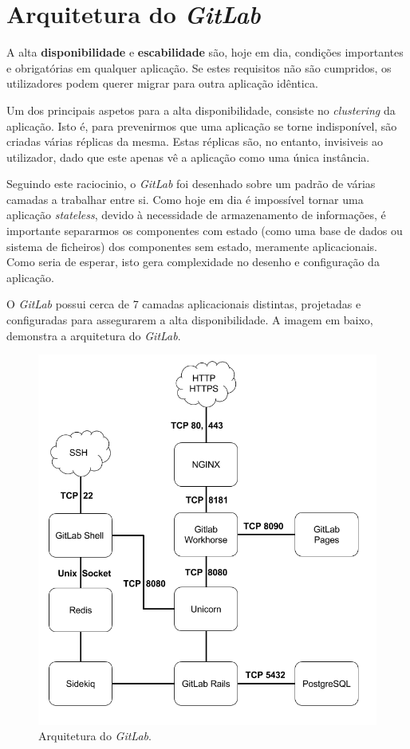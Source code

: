 \documentclass[12pt,a4paper]{article}
\begin{document}
\newpage
\section{Arquitetura do \emph{GitLab}}\label{arq}

A alta \textbf{disponibilidade} e \textbf{escabilidade} são, hoje em dia, condições importantes e obrigatórias em qualquer aplicação. Se estes requisitos não são cumpridos, os utilizadores podem querer migrar para outra aplicação idêntica.

Um dos principais aspetos para a alta disponibilidade, consiste no \emph{clustering} da aplicação. Isto é, para prevenirmos que uma aplicação se torne indisponível, são criadas várias réplicas da mesma. Estas réplicas são, no entanto, invisiveis ao utilizador, dado que este apenas vê a aplicação como uma única instância.

Seguindo este raciocinio, o \emph{GitLab} foi desenhado sobre um padrão de várias camadas a trabalhar entre si. Como hoje em dia é impossível tornar uma aplicação \emph{stateless}, devido à necessidade de armazenamento de informações, é importante separarmos os componentes com estado (como uma base de dados ou sistema de ficheiros) dos componentes sem estado, meramente aplicacionais. Como seria de esperar, isto gera complexidade no desenho e configuração da aplicação.

O \emph{GitLab} possui cerca de 7 camadas aplicacionais distintas, projetadas e configuradas para assegurarem a alta disponibilidade. A imagem em baixo, demonstra a arquitetura do \emph{GitLab}.

\begin{figure}[H]
  \centering
  \includegraphics[scale=0.47]{images/gitlab_architecture_diagram.png}
  \caption{Arquitetura do \emph{GitLab}.}
\end{figure}
\end{document}
